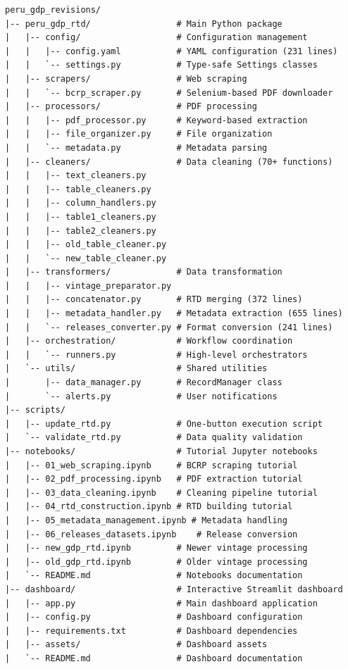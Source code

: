 \documentclass[a4paper, fleqn, 11pt]{article}
\begin{document}
\begin{lstlisting}[caption={Repository directory structure}]
peru_gdp_revisions/
|-- peru_gdp_rtd/                 # Main Python package
|   |-- config/                   # Configuration management
|   |   |-- config.yaml           # YAML configuration (231 lines)
|   |   `-- settings.py           # Type-safe Settings classes
|   |-- scrapers/                 # Web scraping
|   |   `-- bcrp_scraper.py       # Selenium-based PDF downloader
|   |-- processors/               # PDF processing
|   |   |-- pdf_processor.py      # Keyword-based extraction
|   |   |-- file_organizer.py     # File organization
|   |   `-- metadata.py           # Metadata parsing
|   |-- cleaners/                 # Data cleaning (70+ functions)
|   |   |-- text_cleaners.py
|   |   |-- table_cleaners.py
|   |   |-- column_handlers.py
|   |   |-- table1_cleaners.py
|   |   |-- table2_cleaners.py
|   |   |-- old_table_cleaner.py
|   |   `-- new_table_cleaner.py
|   |-- transformers/             # Data transformation
|   |   |-- vintage_preparator.py
|   |   |-- concatenator.py       # RTD merging (372 lines)
|   |   |-- metadata_handler.py   # Metadata extraction (655 lines)
|   |   `-- releases_converter.py # Format conversion (241 lines)
|   |-- orchestration/            # Workflow coordination
|   |   `-- runners.py            # High-level orchestrators
|   `-- utils/                    # Shared utilities
|       |-- data_manager.py       # RecordManager class
|       `-- alerts.py             # User notifications
|-- scripts/
|   |-- update_rtd.py             # One-button execution script
|   `-- validate_rtd.py           # Data quality validation
|-- notebooks/                    # Tutorial Jupyter notebooks
|   |-- 01_web_scraping.ipynb     # BCRP scraping tutorial
|   |-- 02_pdf_processing.ipynb   # PDF extraction tutorial
|   |-- 03_data_cleaning.ipynb    # Cleaning pipeline tutorial
|   |-- 04_rtd_construction.ipynb # RTD building tutorial
|   |-- 05_metadata_management.ipynb # Metadata handling
|   |-- 06_releases_datasets.ipynb    # Release conversion
|   |-- new_gdp_rtd.ipynb         # Newer vintage processing
|   |-- old_gdp_rtd.ipynb         # Older vintage processing
|   `-- README.md                 # Notebooks documentation
|-- dashboard/                    # Interactive Streamlit dashboard
|   |-- app.py                    # Main dashboard application
|   |-- config.py                 # Dashboard configuration
|   |-- requirements.txt          # Dashboard dependencies
|   |-- assets/                   # Dashboard assets
|   `-- README.md                 # Dashboard documentation

\end{lstlisting}
\end{document}
